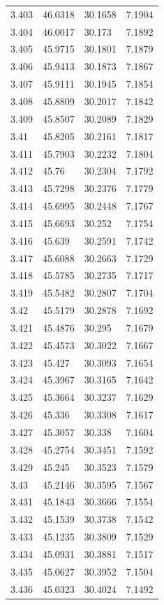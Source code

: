 \begin{tabular}{llll}
3.403 & 46.0318 & 30.1658 & 7.1904 \\
3.404 & 46.0017 & 30.173 & 7.1892 \\
3.405 & 45.9715 & 30.1801 & 7.1879 \\
3.406 & 45.9413 & 30.1873 & 7.1867 \\
3.407 & 45.9111 & 30.1945 & 7.1854 \\
3.408 & 45.8809 & 30.2017 & 7.1842 \\
3.409 & 45.8507 & 30.2089 & 7.1829 \\
3.41 & 45.8205 & 30.2161 & 7.1817 \\
3.411 & 45.7903 & 30.2232 & 7.1804 \\
3.412 & 45.76 & 30.2304 & 7.1792 \\
3.413 & 45.7298 & 30.2376 & 7.1779 \\
3.414 & 45.6995 & 30.2448 & 7.1767 \\
3.415 & 45.6693 & 30.252 & 7.1754 \\
3.416 & 45.639 & 30.2591 & 7.1742 \\
3.417 & 45.6088 & 30.2663 & 7.1729 \\
3.418 & 45.5785 & 30.2735 & 7.1717 \\
3.419 & 45.5482 & 30.2807 & 7.1704 \\
3.42 & 45.5179 & 30.2878 & 7.1692 \\
3.421 & 45.4876 & 30.295 & 7.1679 \\
3.422 & 45.4573 & 30.3022 & 7.1667 \\
3.423 & 45.427 & 30.3093 & 7.1654 \\
3.424 & 45.3967 & 30.3165 & 7.1642 \\
3.425 & 45.3664 & 30.3237 & 7.1629 \\
3.426 & 45.336 & 30.3308 & 7.1617 \\
3.427 & 45.3057 & 30.338 & 7.1604 \\
3.428 & 45.2754 & 30.3451 & 7.1592 \\
3.429 & 45.245 & 30.3523 & 7.1579 \\
3.43 & 45.2146 & 30.3595 & 7.1567 \\
3.431 & 45.1843 & 30.3666 & 7.1554 \\
3.432 & 45.1539 & 30.3738 & 7.1542 \\
3.433 & 45.1235 & 30.3809 & 7.1529 \\
3.434 & 45.0931 & 30.3881 & 7.1517 \\
3.435 & 45.0627 & 30.3952 & 7.1504 \\
3.436 & 45.0323 & 30.4024 & 7.1492 \\

\end{tabular}
